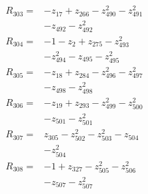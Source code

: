 \begin{align*}
R_{303}={}&-z_{17} +z_{266} -z_{490}^{2} -z_{491}^{2}\\
&-z_{492} -z_{492}^{2}\\[2pt]
R_{304}={}&-1 -z_{2} +z_{275} -z_{493}^{2}\\
&-z_{494}^{2} -z_{495} -z_{495}^{2}\\[2pt]
R_{305}={}&-z_{18} +z_{284} -z_{496}^{2} -z_{497}^{2}\\
&-z_{498} -z_{498}^{2}\\[2pt]
R_{306}={}&-z_{19} +z_{293} -z_{499}^{2} -z_{500}^{2}\\
&-z_{501} -z_{501}^{2}\\[2pt]
R_{307}={}&z_{305} -z_{502}^{2} -z_{503}^{2} -z_{504}\\
&-z_{504}^{2}\\[2pt]
R_{308}={}&-1 +z_{327} -z_{505}^{2} -z_{506}^{2}\\
&-z_{507} -z_{507}^{2}\\[2pt]
\end{align*}
\endgroup
